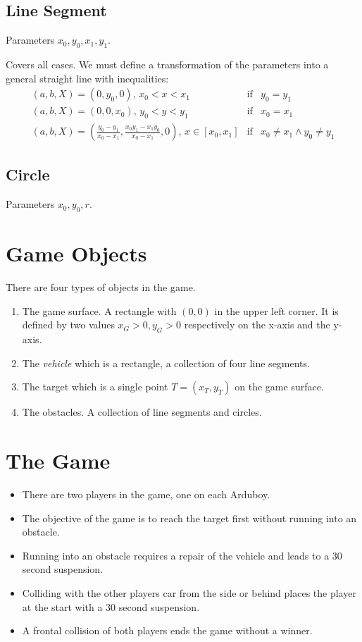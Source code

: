 \documentclass[11pt]{article}
\begin{document}
\subsection*{Line Segment}

Parameters $x_0, y_0, x_1, y_1$. 

Covers all cases. We must define a transformation of the parameters into a
general straight line with inequalities:
\begin{eqnarray*}
    (a, b, X) = (0, y_0, 0) ,\, x_0 < x < x_1 &\text{if}& 
        y_0 = y_1\\
    (a, b, X) = (0, 0, x_0) ,\, y_0 < y < y_1 &\text{if}& 
        x_0 = x_1\\
    (a, b, X) = \left(\frac{y_0 - y_1}{x_0-x_1},
            \frac{x_0 y_1 - x_1 y_0}{x_0 - x_1}, 0\right),\,
    x\in[x_0, x_1] &\text{if}& x_0\neq x_1 \land y_0\neq y_1
\end{eqnarray*}

\subsection*{Circle}

Parameters $x_0, y_0, r$.

\section{Game Objects}
\label{sec-game-objects}
There are four types of objects in the game. 
\begin{enumerate}
    \item The game surface. A rectangle with $(0,0)$ in the upper left corner. 
        It is defined by two values $x_G > 0, y_G>0$ respectively on the x-axis
        and the y-axis.
    \item The {\sl vehicle} which is a rectangle, a collection of four line
        segments.
    \item The target which is a single point $T = (x_T, y_T)$ on the game
        surface.
    \item The obstacles. A collection of line segments and circles.
\end{enumerate}

\section{The Game}
\label{sec-the-game}
\begin{itemize}
    \item There are two players in the game, one on each Arduboy. 
    \item The objective of the game is to reach the target first without 
        running into an obstacle. 
    \item Running into an obstacle requires a repair of the vehicle and leads 
        to a 30 second suspension. 
    \item Colliding with the other players car from the side or behind places
        the player at the start with a 30 second suspension.
    \item A frontal collision of both players ends the game without a winner.
\end{itemize}
\end{document}

